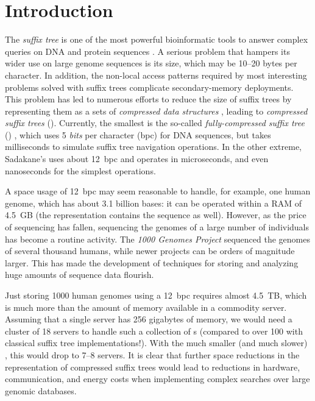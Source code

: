 
\section{Introduction}

The \emph{suffix tree} \cite{Weiner1973} is one of the most powerful bioinformatic tools to
answer complex queries on DNA and protein sequences \cite{Gus97,Ohl13,MBCT15}.
A serious problem that hampers its wider use on large genome sequences is its
size, which may be 10--20 bytes per character. In addition, the non-local
access patterns required by most interesting problems solved with suffix trees
complicate secondary-memory deployments. This problem has led to numerous
efforts to reduce the size of suffix trees by representing them as a sets of
\emph{compressed data structures} \cite{Sadakane2007,Fischer2009a,Ohlebusch2009,Ohlebusch2010,Russo2011,Gog2011a,Abeliuk2013,Navarro2014a}, leading to
\emph{compressed suffix trees} (\CST). Currently, the smallest
\CST{} is the so-called \emph{fully-compressed suffix tree} (\FCST)
\cite{Russo2011,Navarro2014a}, which uses 5 \emph{bits} per character (bpc)
for DNA sequences, but takes milliseconds to simulate suffix
tree navigation operations. In the other extreme, Sadakane's \CST{}
\cite{Sadakane2007} uses about 12~bpc and operates in
microseconds, and even nanoseconds for the simplest operations.

A space usage of 12~bpc may seem reasonable to handle, for example, one human
genome, which has about 3.1 billion bases: it can be operated within a
RAM of 4.5~GB (the representation contains the sequence as well). However,
as the price of sequencing has fallen, sequencing the genomes of a large
number of individuals has become a routine activity. The \emph{1000 Genomes
Project} \cite{1000GP} sequenced the genomes of several thousand humans,
while newer projects can be orders of magnitude larger. This has made the
development of techniques for storing and analyzing huge amounts of sequence
data flourish.

Just storing 1000 human genomes using a 12~bpc \CST{} requires almost 4.5~TB, which
is much more than the amount of memory available in a commodity server. Assuming that
a single server has 256 gigabytes of memory, we would need a cluster of 18 servers to
handle such a collection of \CST{}s (compared to over 100 with classical suffix
tree implementations!). With the much smaller (and much slower) \FCST, this would
drop to 7--8 servers. It is clear that further space reductions in the
representation of compressed suffix trees would lead to reductions in hardware, communication,
and energy costs when implementing complex searches over large genomic
databases.

